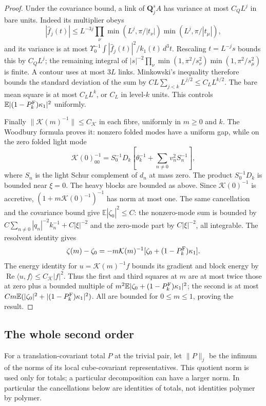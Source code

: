 \documentclass[11pt,letterpaper,reqno]{amsart}
\theoremstyle{definition}
\theoremstyle{remark}
\begin{document}
\begin{proof}
Under the covariance bound, a link of $\mathbf Q_j^sA$ has
variance at most $C_QL^j$ in bare units.  Indeed its multiplier
obeys
\[
 |\hat f_j(t)|\le L^{-3j}
       \prod_\nu\min(L^j,\pi/|t_\nu|)
                    \min(L^j,\pi/|t_\mu|),
\]
and its variance is at most
$\Upsilon_0^{-1}\int|\hat f_j(t)|^2/k_1(t)\,d^3t$.
Rescaling $t=L^{-j}s$ bounds this by $C_QL^j$; the remaining
integral of
$|s|^{-2}\prod_\nu\min(1,\pi^2/s_\nu^2)
\min(1,\pi^2/s_\mu^2)$ is finite.
A contour uses at most $3L$ links.  Minkowski's inequality
therefore bounds the standard deviation of the sum by
$CL\sum_{j<k}L^{j/2}\le C_LL^{k/2}$.
The bare mean square is at most $C_LL^k$, or $C_L$ in
level-$k$ units.  This controls
$\mathbb E|(1-P_k^{\rm F})\kappa_1|^2$ uniformly.

Finally $\|\mathcal K(m)^{-1}\|\le C_{\mathcal K}$ in each
fibre, uniformly in $m\ge0$ and $k$.  The Woodbury formula
proves it: nonzero folded modes have a uniform gap, while on
the zero folded light mode
\[
 \mathcal K(0)^{-1}_{00}
 =S_0^{-1}D_k[\theta_k^{-1}+
                 \sum_{n\ne0}v_n^2S_n^{-1}],
\]
where $S_n$ is the light Schur complement of $d_n$ at mass zero.
The product $S_0^{-1}D_k$ is bounded near $\xi=0$. The heavy blocks
are bounded as above.  Since $\mathcal K(0)^{-1}$ is accretive,
$(1+m\mathcal K(0)^{-1})^{-1}$ has norm at most one.
The same cancellation and the covariance bound give
$\mathbb E|\zeta_0|^2\le C$: the nonzero-mode sum is bounded
by $C\sum_{n\ne0}|q_n|^{-2}k_n^{-1}+C|\xi|^{-2}$ and the
zero-mode part by $C|\xi|^{-2}$, all integrable.
The resolvent identity gives
\[
 \zeta(m)-\zeta_0=-m\mathcal K(m)^{-1}
                         [\zeta_0+(1-P_k^{\rm F})\kappa_1].
\]
The energy identity for $u=\mathcal K(m)^{-1}f$ bounds its
gradient and block energy by
$\operatorname{Re}\langle u,f\rangle\le C_{\mathcal K}|f|^2$.
Thus the first and third squares at $m$ are at most twice
those at zero plus a bounded multiple of
$m^2\mathbb E|\zeta_0+(1-P_k^{\rm F})\kappa_1|^2$; the second is
at most $Cm\mathbb E(|\zeta_0|^2+|(1-P_k^{\rm F})\kappa_1|^2)$.
All are bounded for $0\le m\le1$, proving the result.
\end{proof}

\subsection{The whole second order}

For a translation-covariant total $P$ at the trivial pair, let
$\|P\|_j$ be the infimum of the norms of its local
cube-covariant representatives.  This quotient norm is used
only for totals; a particular decomposition can have a larger
norm.  In particular the cancellations below are identities
of totals, not identities polymer by polymer.
\end{document}
